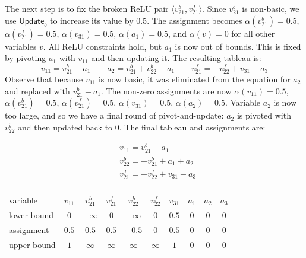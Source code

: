 \documentclass[a4paper]{llncs}
\newcommand{\assignment}{\alpha{}}
\newcommand{\irulename}[2]{\ensuremath{\mathsf{#1}_{#2}}\xspace}
\newcommand{\updateb}{\irulename{Update}{b}}
\begin{document}
The next step is to fix the broken ReLU pair $\langle{v_{21}^b, v_{21}^f}\rangle$. Since $v_{21}^b$ is non-basic, we use \updateb{} to 
increase its value by $0.5$. The assignment becomes
$\assignment(v_{21}^b) = 0.5$,
$\assignment(v_{21}^f) = 0.5$,
$\assignment(v_{31}) = 0.5$,
$\assignment(a_1) = 0.5$,
and $\assignment(v) = 0$ for all other variables $v$. All ReLU constraints hold, but
 $a_1$ is now out of bounds. This is fixed
by pivoting $a_1$ with $v_{11}$ and then updating it. The
resulting tableau is:
\[
  v_{11} = v_{21}^b - a_1 \qquad
  a_2 = v_{21}^b + v^b_{22} - a_1  \qquad
  v_{21}^f = -v_{22}^f + v_{31} -a_3  
\]
Observe that because $v_{11}$ is now basic, it was eliminated from the
equation for $a_2$ and replaced with $v_{21}^b - a_1$.
 The non-zero assignments are now
$\assignment(v_{11}) = 0.5$,
$\assignment(v_{21}^b) = 0.5$,
$\assignment(v_{21}^f) = 0.5$,
$\assignment(v_{31}) = 0.5$,
$\assignment(a_2) = 0.5$. 
Variable $a_2$ is now too large, and so we have a final round of
pivot-and-update: $a_2$ is pivoted with $v_{22}^b$ and then updated back
to $0$. The final tableau and assignments are:

\noindent
\begin{minipage}{.35\textwidth}
\begin{align*}
&  v_{11} = v_{21}^b - a_1 \\
&  v_{22}^b = -v_{21}^b +  a_1  + a_2 \\
&  v_{21}^f = -v_{22}^f + v_{31} -a_3  \\
\end{align*}
\end{minipage}
\begin{minipage}{.50\textwidth}
\begin{center}
\begin{tabular}{l|ccccccccc}
  variable &
  $v_{11}$ &
  $v_{21}^b$ &
  $v_{21}^f$ &
  $v_{22}^b$ &
  $v_{22}^f$ &
  $v_{31}$ &
  $a_1$ &
  $a_2$ &
  $a_3$ 
\\
  \cline{2-10}
  lower bound &
  $0$ &
  $-\infty$ &
  $0$ &
  $-\infty$ &
  $0$ &
  $0.5$ &
  $0$ &
  $0$ &
  $0$ 
\\
  \cline{2-10}
  assignment &
  $0.5$ &
  $0.5$ &
  $0.5$ &
  $-0.5$ &
  $0$ &
  $0.5$ &
  $0$ &
  $0$ &
  $0$              
\\
  \cline{2-10}
  upper bound &
  $1$ &
  $\infty$ &
  $\infty$ &
  $\infty$ &
  $\infty$ &
  $1$ &
  $0$ &
  $0$ &
  $0$ 
\end{tabular}
\end{center}
\end{minipage}
 
\end{document}
